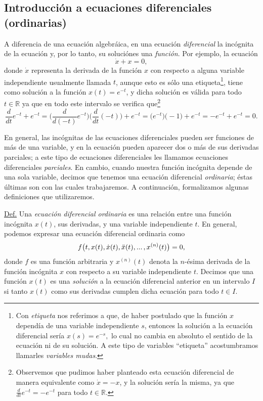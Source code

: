 \documentclass[12pt,libertine]{book}
\begin{document}
\newpage
\subsection*{Introducción a ecuaciones diferenciales (ordinarias)} \label{Subsec:Introducción a ecuaciones diferenciales ordinarias}

A diferencia de una ecuación algebráica, en una ecuación \emph{diferencial} la incógnita de la ecuación \textemdash y, por lo tanto, su solución\textemdash es una \emph{función}. Por ejemplo, la ecuación $$\dot{x} + x = 0,$$ donde $\dot{x}$ representa la derivada de la función $x$ con respecto a alguna variable independiente \textemdash usualmente llamada $t$, aunque esto es sólo una etiqueta\footnote{Con \emph{etiqueta} nos referimos a que, de haber postulado que la función $x$ dependía de una variable independiente $s$, entonces la solución a la ecuación diferencial sería $x(s)=e^{-s},$ lo cual no cambia en absoluto el sentido de la ecuación ni de su solución. A este tipo de variables ``etiqueta'' acostumbramos llamarles \emph{variables mudas}.}\textemdash, tiene como solución a la función $x(t)=e^{-t}$, y dicha solución es válida para todo $t\in\mathbb{R}$ ya que en todo este intervalo se verifica que\footnote{Observemos que pudimos haber planteado esta ecuación diferencial de manera equivalente como $\dot{x}=-x$, y la solución sería la misma, ya que $\frac{d}{dt}e^{-t}=-e^{-t}$ para todo $t\in\mathbb{R}$.} $$\frac{d }{dt}e^{-t} + e^{-t} = \bigg(\frac{d}{d(-t)}e^{-t}\bigg)\bigg(\frac{d }{dt}(-t)\bigg) + e^{-t} = \big(e^{-t}\big)\big(-1\big)+e^{-t} = -e^{-t}+e^{-t}= 0.$$

\vspace{3mm}
En general, las incógnitas de las ecuaciones diferenciales pueden ser funciones de más de una variable, y en la ecuación pueden aparecer dos o más de sus derivadas parciales; a este tipo de ecuaciones diferenciales les llamamos ecuaciones diferenciales \emph{parciales}. En cambio, cuando nuestra función incógnita depende de una sola variable, decimos que tenemos una ecuación diferencial \emph{ordinaria}; éstas últimas son con las cuales trabajaremos. A continuación, formalizamos algunas definiciones que utilizaremos.

\vspace{3mm}
\begin{tcolorbox}
\underline{Def.} Una \emph{ecuación diferencial ordinaria} es una relación entre una función incógnita $x(t)$, sus derivadas, y una variable independiente $t$. En general, podemos expresar una ecuación diferencial ordinaria como $$f\big(t,x(t),\dot{x}(t),\ddot{x}(t),...\hspace{0.5mm},x^{(n)}(t)\big)=0,$$ donde $f$ es una función arbitraria y $x^{(n)}(t)$ denota la $n$-ésima derivada de la función incógnita $x$ con respecto a su variable independiente $t$. Decimos que una función $x(t)$ es una \emph{solución} a la ecuación diferencial anterior en un intervalo $I$ si tanto $x(t)$ como sus derivadas cumplen dicha ecuación para todo $t\in I$.
\end{tcolorbox}
\end{document}
